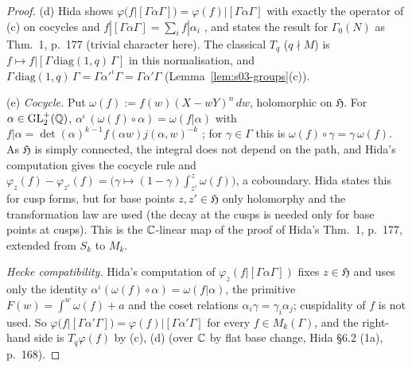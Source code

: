 \begin{proof}
(d) Hida shows $\varphi(f|[\Gamma\alpha\Gamma])=\varphi(f)|[\Gamma\alpha\Gamma]$ with exactly the operator of (c) on cocycles and $f|[\Gamma\alpha\Gamma]=\sum_if|\alpha_i$
, and states the result for $\Gamma_0(N)$ as Thm.~1, p.~177 (trivial
character here). The classical $T_q$ ($q\nmid M$) is $f\mapsto f|[\Gamma\,\mathrm{diag}(1,q)\,\Gamma]$ in this normalisation, and $\Gamma\,\mathrm{diag}(1,q)\,\Gamma=\Gamma\alpha'^\iota\Gamma=\Gamma\alpha'\Gamma$
(Lemma~\ref{lem:s03-groups}(c)). \stknown

(e) \emph{Cocycle.} Put $\omega(f):=f(w)(X-wY)^n\,dw$, holomorphic on $\mathfrak H$. For $\alpha\in\mathrm{GL}_2^+(\mathbb{Q})$, $\alpha^\iota\,(\omega(f)\circ\alpha)=\omega(f|\alpha)$ with
$f|\alpha=\det(\alpha)^{k-1}f(\alpha w)j(\alpha,w)^{-k}$ ; for $\gamma\in\Gamma$ this is
$\omega(f)\circ\gamma=\gamma\,\omega(f)$. As $\mathfrak H$ is simply connected, the integral does not depend on the path, and Hida's computation
 gives the cocycle rule and
$\varphi_z(f)-\varphi_{z'}(f)=\big(\gamma\mapsto(1-\gamma)\int_{z'}^{z}\omega(f)\big)$, a coboundary. Hida states this for cusp forms, but for base points $z,z'\in\mathfrak H$ only
holomorphy and the transformation law are used (the decay at the cusps is needed only for base points at cusps). This is the $\mathbb{C}$-linear map of the proof of Hida's
Thm.~1, p.~177, extended from $S_k$ to $M_k$.

\emph{Hecke compatibility.} Hida's computation  of
$\varphi_z(f|[\Gamma\alpha\Gamma])$ fixes $z\in\mathfrak H$ and uses only the identity $\alpha^\iota(\omega(f)\circ\alpha)=\omega(f|\alpha)$, the primitive
$F(w)=\int^w\omega(f)+a$ and the coset relations $\alpha_i\gamma=\gamma_i\alpha_j$; cuspidality of $f$ is not used. So $\varphi(f|[\Gamma\alpha'\Gamma])=\varphi(f)|[\Gamma\alpha'\Gamma]$
for every $f\in M_k(\Gamma)$, and the right-hand side is $T_q\varphi(f)$ by (c), (d) (over $\mathbb{C}$ by flat base change, Hida \S6.2 (1a), p.~168).


\end{proof}
